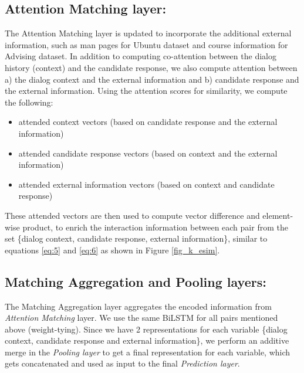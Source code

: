 \documentclass[letterpaper]{article} %
\begin{document}
\subsection{Attention Matching layer:}
The Attention Matching layer is updated to incorporate the additional external information, such as man pages for Ubuntu dataset and course information for Advising dataset. In addition to computing co-attention between the dialog history (context) and the candidate response, we also compute attention between a) the dialog context and the external information and b) candidate response and the external information. Using the attention scores for similarity, we compute the following:
\begin{itemize}
    \item attended context vectors (based on candidate response and the external information)
    \item attended candidate response vectors (based on context and the external information)
    \item attended external information vectors (based on context and candidate response)
\end{itemize}
These attended vectors are then used to compute vector difference and element-wise product, to enrich the interaction information between each pair from the set \{dialog context, candidate response, external information\}, similar to equations \ref{eq:5} and \ref{eq:6} as shown in Figure \ref{fig_k_esim}.

\subsection{Matching Aggregation and Pooling layers:}
The Matching Aggregation layer aggregates the encoded information from \textit{Attention Matching} layer. We use the same BiLSTM for all pairs mentioned above (weight-tying). Since we have 2 representations for each variable \{dialog context, candidate response and external information\}, we perform an additive merge in the \textit{Pooling layer} to get a final representation for each variable, which gets concatenated and used as input to the final \textit{Prediction layer}.
\end{document}
